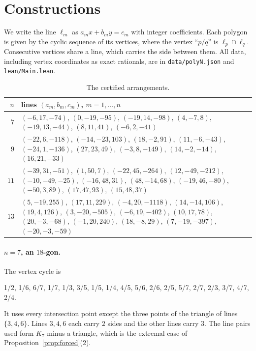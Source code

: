 \section{Constructions}\label{sec:constructions}

We write the line $\ell_m$ as $a_mx+b_my=c_m$ with integer coefficients. Each polygon is given by the
cyclic sequence of its vertices, where the vertex ``$p/q$'' is $\ell_p\cap\ell_q$. Consecutive vertices
share a line, which carries the side between them. All data, including vertex coordinates as exact
rationals, are in \texttt{data/polyN.json} and \texttt{lean/Main.lean}.

\begin{table}[h]
\centering\small
\begin{tabular}{@{}r>{\raggedright\arraybackslash}p{}@{}}
\toprule
$n$ & lines $(a_m,b_m,c_m)$, $m=1,\dots,n$\\
\midrule
$7$ & $(-6,17,-74)$, $(0,-19,-95)$, $(-19,14,-98)$, $(4,-7,8)$, $(-19,13,-44)$, $(8,11,41)$, $(-6,2,-41)$\\
$9$ & $(-22,6,-118)$, $(-14,-23,103)$, $(18,-2,91)$, $(11,-6,-43)$, $(-24,1,-136)$, $(27,23,49)$,
      $(-3,8,-149)$, $(14,-2,-14)$, $(16,21,-33)$\\
$11$ & $(-39,31,-51)$, $(1,50,7)$, $(-22,45,-264)$, $(12,-49,-212)$, $(-10,-49,-25)$, $(-16,48,31)$,
       $(48,-14,68)$, $(-19,46,-80)$, $(-50,3,89)$, $(17,47,93)$, $(15,48,37)$\\
$13$ & $(5,-19,255)$, $(17,11,229)$, $(-4,20,-1118)$, $(14,-14,106)$, $(19,4,126)$, $(3,-20,-505)$,
       $(-6,19,-402)$, $(10,17,78)$, $(20,-3,-68)$, $(-1,20,240)$, $(18,-8,29)$, $(7,-19,-397)$,
       $(-20,-3,-59)$\\
\bottomrule
\end{tabular}
\caption{The certified arrangements.}\label{tab:lines}
\end{table}

\paragraph{$n=7$, an $18$-gon.} The vertex cycle is
\begin{center}\small
1/2, 1/6, 6/7, 1/7, 1/3, 3/5, 1/5, 1/4, 4/5, 5/6, 2/6, 2/5, 5/7, 2/7, 2/3, 3/7, 4/7, 2/4.
\end{center}
It uses every intersection point except the three points of the triangle of lines $\{3,4,6\}$. Lines
$3,4,6$ each carry $2$ sides and the other lines carry $3$. The line pairs used form $K_7$ minus a
triangle, which is the extremal case of Proposition~\ref{prop:forced}(2).

